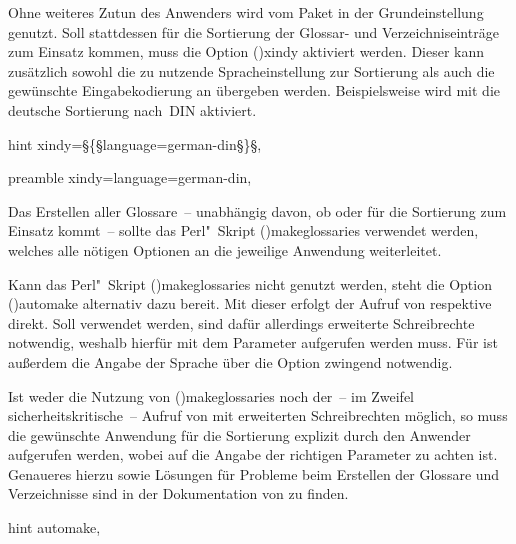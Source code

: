 \documentclass[%
  english,ngerman,%
  cdgeometry=no,DIV=12,%
  cd=false,cdfont=false,cdtitle=true,%
  headings=normal,%
  automark,%
  listof=toc,%
]{tudscrartcl}
\begin{document}
Ohne weiteres Zutun des Anwenders wird vom Paket  in der 
Grundeinstellung  genutzt. Soll stattdessen für die 
Sortierung der Glossar- und Verzeichniseinträge  zum Einsatz 
kommen, muss die Option \Option(){xindy} aktiviert werden.
Dieser kann zusätzlich sowohl die zu nutzende Spracheinstellung zur Sortierung 
als auch die gewünschte Eingabekodierung an  übergeben 
werden. Beispielsweise wird mit 
die deutsche Sortierung nach~DIN aktiviert.
%
\begin{Code}{hint}
  xindy=§\{§language=german-din§\}§, %
\end{Code}
\begin{Code}[nolst]{preamble}
  xindy={language=german-din},
\end{Code}

Das Erstellen aller Glossare~-- unabhängig davon, ob  oder 
 für die Sortierung zum Einsatz kommt~-- sollte das 
Perl"~Skript \Application(){makeglossaries} verwendet 
werden, welches alle nötigen Optionen an die jeweilige Anwendung weiterleitet.


Kann das Perl"~Skript \Application(){makeglossaries} nicht 
genutzt werden, steht die Option \Option(){automake} 
alternativ dazu bereit. Mit dieser erfolgt der Aufruf von  
respektive  direkt. Soll  verwendet 
werden, sind dafür allerdings erweiterte Schreibrechte notwendig, weshalb 
 hierfür mit dem Parameter  aufgerufen 
werden muss. Für  ist außerdem die Angabe der Sprache über 
die Option  zwingend notwendig. 

Ist weder die Nutzung von \Application(){makeglossaries} 
noch der~-- im Zweifel sicherheitskritische~-- Aufruf von  mit 
erweiterten Schreibrechten möglich, so muss die gewünschte Anwendung für die 
Sortierung explizit durch den Anwender aufgerufen werden, wobei auf die Angabe 
der richtigen Parameter zu achten ist. Genaueres hierzu sowie Lösungen für 
Probleme beim Erstellen der Glossare und Verzeichnisse sind in der Dokumentation
von  zu finden.
%
\begin{Code}{hint}
  automake,%
\end{Code}
\end{document}
